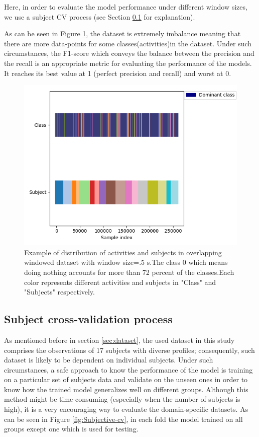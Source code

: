 Here, in order to evaluate the model performance under different window sizes, we use a subject CV process (see Section \ref{sub:subjective CV} for explanation).

As can be seen in Figure \ref{fig:class}, the dataset is extremely imbalance meaning that there are more data-points for some classes(activities)in the dataset. Under such circumstances, the F1-score which conveys the balance between the precision and the recall is an appropriate metric for evaluating the performance of the models. It reaches its best value at 1 (perfect precision and recall) and worst at 0.

\begin{figure}[h]
    \centering
    \includegraphics[width=.4\textwidth]{Figures/Class_subject.png}
    \caption{Example of distribution of activities and subjects in overlapping windowed dataset with window size=.5 s.The class 0 which means doing nothing accounts for more than 72 percent of the classes.Each color represents different activities and subjects in "Class" and "Subjects" respectively.}
    \label{fig:class}
\end{figure}

\subsection{Subject cross-validation process} \label{sub:subjective CV}
As mentioned before in section \ref{sec:dataset}, the used dataset in this study comprises the observations of 17 subjects with diverse profiles; consequently, such dataset is likely to be dependent on individual subjects. Under such circumstances, a safe approach to know the performance of the model is training on a particular set of subjects data and validate on the unseen ones in order to know how the trained model generalizes well on different groups. Although this method might be time-consuming (especially when the number of subjects is high), it is a very encouraging way to evaluate the domain-specific datasets. As can be seen in Figure \ref{fig:Subjective-cv}, in each fold the model trained on all groups except one which is used for testing.

